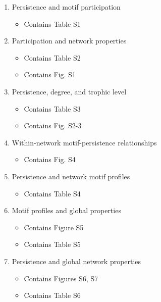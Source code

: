 \documentclass[12pt]{article}
\begin{document}
\begin{spacing}{2.0}
{\begin{spacing}{1.0}
\begin{enumerate}
        \item Persistence and motif participation
            \begin{itemize}
                \item Contains Table S1
            \end{itemize}


        \item Participation and network properties

            \begin{itemize}
                \item Contains Table S2
                \item Contains Fig. S1
            \end{itemize}
    
        \item Persistence, degree, and trophic level

            \begin{itemize}
                \item Contains Table S3
                \item Contains Fig. S2-3
            \end{itemize}    

        \item Within-network motif-persistence relationships

            \begin{itemize}
                \item Contains Fig. S4
            \end{itemize}    
    
        \item Persistence and network motif profiles

            \begin{itemize}
                \item Contains Table S4
            \end{itemize}   
        
        \item Motif profiles and global properties

            \begin{itemize}
                \item Contains Figure S5
                \item Contains Table S5
            \end{itemize}

        \item Persistence and global network properties
            \begin{itemize}
                \item Contains Figures S6, S7
                \item Contains Table S6
            \end{itemize}


\end{enumerate}
\end{spacing}}
\end{spacing}
\end{document}
